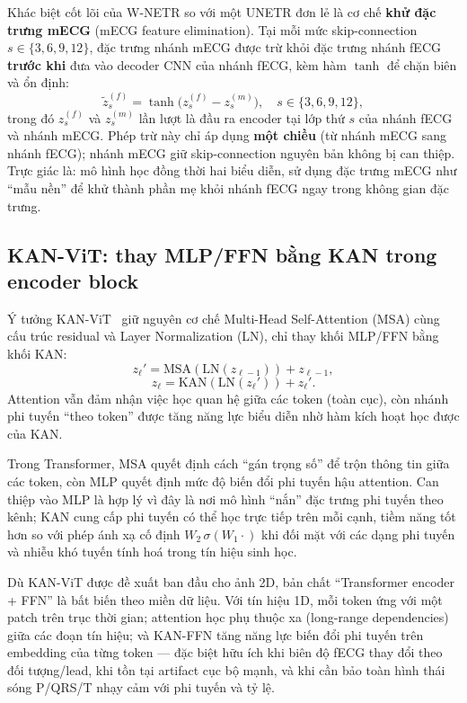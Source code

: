 \documentclass[../DoAn.tex]{subfiles}
\begin{document}
Khác biệt cốt lõi của W-NETR so với một UNETR đơn lẻ là cơ chế \textbf{khử đặc trưng mECG} (mECG feature elimination). Tại mỗi mức skip-connection $s \in \{3, 6, 9, 12\}$, đặc trưng nhánh mECG được trừ khỏi đặc trưng nhánh fECG \textbf{trước khi} đưa vào decoder CNN của nhánh fECG, kèm hàm $\tanh$ để chặn biên và ổn định:
\begin{equation}
  \tilde{z}_s^{(f)} = \tanh\big(z_s^{(f)} - z_s^{(m)}\big),
  \quad s \in \{3,6,9,12\},
  \label{eq:feature_elim}
\end{equation}
trong đó $z_s^{(f)}$ và $z_s^{(m)}$ lần lượt là đầu ra encoder tại lớp thứ $s$ của nhánh fECG và nhánh mECG. Phép trừ này chỉ áp dụng \textbf{một chiều} (từ nhánh mECG sang nhánh fECG); nhánh mECG giữ skip-connection nguyên bản không bị can thiệp. Trực giác là: mô hình học đồng thời hai biểu diễn, sử dụng đặc trưng mECG như ``mẫu nền'' để khử thành phần mẹ khỏi nhánh fECG ngay trong không gian đặc trưng.

\subsection{KAN-ViT: thay MLP/FFN bằng KAN trong encoder block}

Ý tưởng KAN-ViT~\cite{yeElevatingVisionTransformer2024} giữ nguyên cơ chế Multi-Head Self-Attention (MSA) cùng cấu trúc residual và Layer Normalization (LN), chỉ thay khối MLP/FFN bằng khối KAN:
\begin{equation}
  z_\ell' = \mathrm{MSA}(\mathrm{LN}(z_{\ell-1})) + z_{\ell-1},
\end{equation}
\begin{equation}
  z_\ell = \mathrm{KAN}(\mathrm{LN}(z_\ell')) + z_\ell'.
\end{equation}
Attention vẫn đảm nhận việc học quan hệ giữa các token (toàn cục), còn nhánh phi tuyến ``theo token'' được tăng năng lực biểu diễn nhờ hàm kích hoạt học được của KAN.

Trong Transformer, MSA quyết định cách ``gán trọng số'' để trộn thông tin giữa các token, còn MLP quyết định mức độ biến đổi phi tuyến hậu attention. Can thiệp vào MLP là hợp lý vì đây là nơi mô hình ``nắn'' đặc trưng phi tuyến theo kênh; KAN cung cấp phi tuyến có thể học trực tiếp trên mỗi cạnh, tiềm năng tốt hơn so với phép ánh xạ cố định $W_2\,\sigma(W_1 \cdot)$ khi đối mặt với các dạng phi tuyến và nhiễu khó tuyến tính hoá trong tín hiệu sinh học.

Dù KAN-ViT được đề xuất ban đầu cho ảnh 2D, bản chất ``Transformer encoder + FFN'' là bất biến theo miền dữ liệu. Với tín hiệu 1D, mỗi token ứng với một patch trên trục thời gian; attention học phụ thuộc xa (long-range dependencies) giữa các đoạn tín hiệu; và KAN-FFN tăng năng lực biến đổi phi tuyến trên embedding của từng token --- đặc biệt hữu ích khi biên độ fECG thay đổi theo đối tượng/lead, khi tồn tại artifact cục bộ mạnh, và khi cần bảo toàn hình thái sóng P/QRS/T nhạy cảm với phi tuyến và tỷ lệ.
\end{document}

